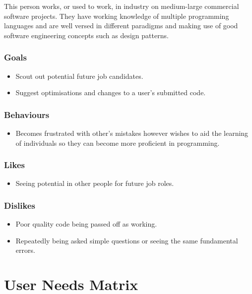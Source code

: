 \documentclass[11pt,a4paper]{article}
\begin{document}
This person works, or used to work, in industry on medium-large commercial
software projects. They have working knowledge of multiple programming
languages and are well versed in different paradigms and making use of good
software engineering concepts such as design patterns.

\subsubsection{Goals}

\begin{itemize}
\item Scout out potential future job candidates.
\item Suggest optimisations and changes to a user's submitted code.
\end{itemize}

\subsubsection{Behaviours}

\begin{itemize}
\item Becomes frustrated with other's mistakes however wishes to aid the
learning of individuals so they can become more proficient in programming.
\end{itemize}

\subsubsection{Likes}

\begin{itemize}
\item Seeing potential in other people for future job roles.
\end{itemize}

\subsubsection{Dislikes}

\begin{itemize}
\item Poor quality code being passed off as working.
\item Repeatedly being asked simple questions or seeing the same fundamental
errors.
\end{itemize}

\newpage

\section{User Needs Matrix}
\end{document}
